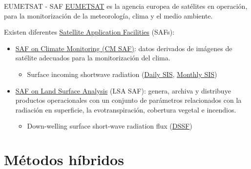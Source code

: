 \documentclass[aspectratio=169, usenames,svgnames,dvipsnames]{beamer}
\begin{document}
\begin{frame}[label={sec:org2658665}]{EUMETSAT - SAF}
\alert{\href{http://www.eumetsat.int}{EUMETSAT}} es la agencia europea de satélites en operación, para la monitorización de la meteorología, clima y el medio ambiente.
\vfill

Existen diferentes \alert{\href{https://www.eumetsat.int/about-us/satellite-application-facilities-safs}{Satellite Application Facilities} (SAFs)}:
\begin{itemize}
\item \href{https://wui.cmsaf.eu/safira/action/viewProduktSearch}{SAF on Climate Monitoring (CM SAF)}: datos derivados de imágenes de satélite adecuados para la monitorización del clima.
\begin{itemize}
\item \alert{Surface incoming shortwave radiation} (\href{https://wui.cmsaf.eu/safira/action/viewProduktDetails?eid=22482\&fid=36}{Daily SIS}, \href{https://wui.cmsaf.eu/safira/action/viewProduktDetails?eid=22483\&fid=36}{Monthly SIS})
\end{itemize}

\vfill

\item \href{https://landsaf.ipma.pt/en/}{SAF on Land Surface Analysis} (LSA SAF): genera, archiva y distribuye productos operacionales con un conjunto de parámetros relacionados con la radiación en superficie, la evotranspiración, cobertura vegetal e incendios.
\begin{itemize}
\item \alert{Down-welling surface short-wave radiation flux} (\href{https://landsaf.ipma.pt/en/products/longwave-shortwave-radiation/dssf/}{DSSF})
\end{itemize}
\end{itemize}
\end{frame}
\section{Métodos híbridos}
\label{sec:orge7c8a12}
\end{document}
